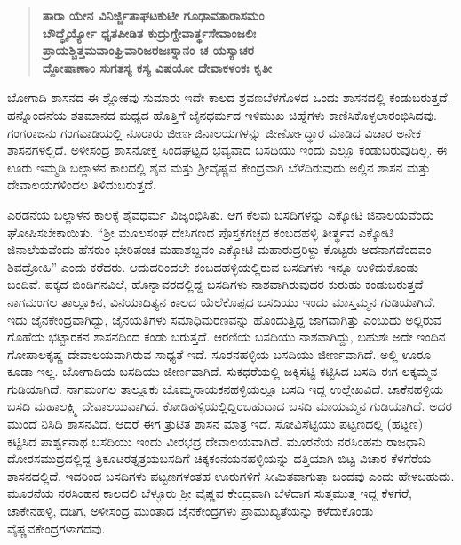 \begin{verse}
\textbf{ತಾರಾ ಯೇನ ವಿನಿರ್ಜ್ಜಿತಾಘಟಕುಟೀ ಗೂಢಾವತಾರಾಸಮಂ} \\\textbf{ಬೌದ್ಧೈರ್ಯ್ಯೋ ಧೃತಪೀಡಿತ ಕುದ್ರುಗ್ದೇವಾರ್ತ್ಥಸೇವಾಂಜಲಿಃ} \\\textbf{ಪ್ರಾಯಶ್ಚಿತ್ತಮವಾಂಘ್ರಿವಾರಿಜರಜಃಸ್ನಾನಂ ಚ ಯಸ್ಯಾಚರ} \\\textbf{ದ್ದೋಷಾಣಾಂ ಸುಗತಸ್ಯ ಕಸ್ಯ ವಿಷಯೋ ದೇವಾಕಳಂಕಃ ಕೃತೀ}
\end{verse}

ಬೋಗಾದಿ ಶಾಸನದ ಈ ಶ್ಲೋಕವು ಸುಮಾರು ಇದೇ ಕಾಲದ ಶ್ರವಣಬೆಳಗೊಳದ ಒಂದು ಶಾಸನದಲ್ಲಿ ಕಂಡುಬರುತ್ತದೆ. ಹನ್ನೊಂದನೆಯ ಶತಮಾನದ ಮಧ್ಯದ ಹೊತ್ತಿಗೆ ಜೈನಧರ್ಮದ ಇಳಿಮುಖ ಚಿಹ್ನೆಗಳು ಕಾಣಿಸಿಕೊಳ್ಳಲಾರಂಭಿಸಿದವು. ಗಂಗರಾಜನು ಗಂಗವಾಡಿಯಲ್ಲಿ ನೂರಾರು ಜೀರ್ಣಜಿನಾಲಯಗಳನ್ನು ಜೀರ್ಣೋದ್ಧಾರ ಮಾಡಿದ ವಿಚಾರ ಅನೇಕ ಶಾಸನಗಳಲ್ಲಿದೆ. ಅಳೀಸಂದ್ರ ಶಾಸನೋಕ್ತ ಸಿಂದಘಟ್ಟದ ಭವ್ಯವಾದ ಬಸದಿಯು ಇಂದು ಎಲ್ಲೂ ಕಂಡುಬರುವುದಿಲ್ಲ. ಈ ಊರು ಇಮ್ಮಡಿ ಬಲ್ಲಾಳನ ಕಾಲದಲ್ಲಿ ಶೈವ ಮತ್ತು ಶ‍್ರೀವೈಷ್ಣವ ಕೇಂದ್ರವಾಗಿ ಬೆಳೆದಿರುವುದು ಅಲ್ಲಿನ ಶಾಸನ ಮತ್ತು ದೇವಾಲಯಗಳಿಂದಲ ತಿಳಿದುಬರುತ್ತದೆ.

ಎರಡನೆಯ ಬಲ್ಲಾಳನ ಕಾಲಕ್ಕೆ ಶೈವಧರ್ಮ ವಿಜೃಂಭಿಸಿತು. ಆಗ ಕೆಲವು ಬಸದಿಗಳನ್ನು ಎಕ್ಕೋಟಿ ಜಿನಾಲಯವೆಂದು ಘೋಷಿಸಬೇಕಾಯಿತು. “ಶ‍್ರೀ ಮೂಲಸಂಘ ದೇಸಿಗಣದ ಪೊಸ್ತಕಗಚ್ಛದ ಕಂಬದಹಳ್ಳಿ ತೀರ್ತ್ಥವ ಎಕ್ಕೋಟಿ ಜಿನಾಲೆಯವೆಂದು ಹೆಸರುಂ ಭೇರಿಪಂಚ ಮಹಾಶಬ್ದವಂ ಎಕ್ಕೋಟಿ ಮಹಾರುದ್ರರಿಳ್ದು ಕೊಟ್ಟರು ಅದನಾಗದೆಂದವಂ ಶಿವದ್ರೋಹಿ” ಎಂದು ಕರೆದರು. ಆದುದರಿಂದಲೇ ಕಂಬದಹಳ್ಳಿಯಲ್ಲಿರುವ ಬಸದಿಗಳು ಇನ್ನೂ ಉಳಿದುಕೊಂಡು ಬಂದಿವೆ. ಪಕ್ಕದ ಬಿಂಡಿಗನವಿಲೆ, ಹೊನ್ನಾವರದಲ್ಲಿದ್ದ ಬಸದಿಗಳು ನಾಶವಾಗಿರುವುದರ ಕುರುಹು ಕಂಡುಬರುತ್ತದೆ ನಾಗಮಂಗಲ ತಾಲ್ಲೂಕಿನ, ವಿನಯಾದಿತ್ಯನ ಕಾಲದ ಯೆಲೆಕೊಪ್ಪದ ಬಸದಿಯು ಇಂದು ಮಾಸ್ತಮ್ಮನ ಗುಡಿಯಾಗಿದೆ. ಇದು ಜೈನಕೇಂದ್ರವಾಗಿದ್ದು, ಜೈನಯತಿಗಳು ಸಮಾಧಿಮರಣವನ್ನು ಹೊಂದುತ್ತಿದ್ದ ಜಾಗವಾಗಿತ್ತು ಎಂಬುದು ಅಲ್ಲಿರುವ ಗೊಹೆಯ ಭಟ್ಟಾರಕನ ಶಾಸನದಿಂದ ಕಂಡು ಬರುತ್ತದೆ. ಆರಣಿಯ ಬಸದಿಯು ನಾಶವಾಗಿದ್ದು, ಬಹುಶಃ ಅದೇ ಇಂದಿನ ಗೋಪಾಲಕೃಷ್ಣ ದೇವಾಲಯವಾಗಿರುವ ಸಾಧ್ಯತೆ ಇದೆ. ಸೂರನಹಳ್ಳಿಯ ಬಸದಿಯು ಜೀರ್ಣವಾಗಿದೆ. ಅಲ್ಲಿ ಊರೂ ಕೂಡಾ ಇಲ್ಲ. ಬೋಗಾದಿಯ ಬಸದಿಯು ಜೀರ್ಣವಾಗಿದೆ. ಸುಕಧರೆಯಲ್ಲಿ ಜಕ್ಕಿಸೆಟ್ಟಿ ಕಟ್ಟಿಸಿದ ಬಸದಿ ಈಗ ಲಕ್ಕಮ್ಮನ ಗುಡಿಯಾಗಿದೆ. ನಾಗಮಂಗಲ ತಾಲ್ಲೂಕು ಬೊಮ್ಮನಾಯಕನಹಳ್ಳಿಯಲ್ಲೂ ಬಸದಿ ಇದ್ದ ಉಲ್ಲೇಖವಿದೆ. ಚಾಕೆನಹಳ್ಳಿಯ ಬಸದಿ ಮಹಾಲಕ್ಷ್ಮಿ ದೇವಾಲಯವಾಗಿದೆ. ಕೋಡಿಹಳ್ಳಿಯಲ್ಲಿದ್ದಿರಬಹುದಾದ ಬಸದಿ ಮಾಯಮ್ಮನ ಗುಡಿಯಾಗಿದೆ. ಅದರ ಮುಂದೆ ನಿಸಿದಿ ಶಾಸನವಿದೆ. ಆದರೆ ಈಗ ತ್ರುಟಿತ ಶಾಸನ ಮಾತ್ರ ಇದೆ. ಸೋವಿಸೆಟ್ಟಿಯು ಪಟ್ಟಣದಲ್ಲಿ (ಹಟ್ಟಣ) ಕಟ್ಟಿಸಿದ ಪಾರ್ಶ್ವನಾಥ ಬಸದಿಯು ಇಂದು ವೀರಭದ್ರ ದೇವಾಲಯವಾಗಿದೆ. ಮೂರನೆಯ ನರಸಿಂಹನು ರಾಜಧಾನಿ ದೋರಸಮುದ್ರದಲ್ಲಿದ್ದ ತ್ರಿಕೂಟರತ್ನತ್ರಯಬಸದಿಗೆ ಚಿಕ್ಕಕಂನೆಯನಹಳ್ಳಿಯನ್ನು ದತ್ತಿಯಾಗಿ ಬಿಟ್ಟ ವಿಚಾರ ಕೆಳಗೆರೆಯ ಶಾಸನದಲ್ಲಿದೆ. ಇದರಿಂದ ಬಸದಿಗಳು ಪಟ್ಟಣಗಳಂತಹ ಊರುಗಳಿಗೆ ಸೀಮಿತವಾಗುತ್ತಾ ಬಂದವು ಎಂದು ಹೇಳಬಹುದು. ಮೂರನೆಯ ನರಸಿಂಹನ ಕಾಲದಲಿ ಬೆಳ್ಳೂರು ಶ‍್ರೀ ವೈಷ್ಣವ ಕೇಂದ್ರವಾಗಿ ಬೆಳೆದಾಗ ಸುತ್ತಮುತ್ತ ಇದ್ದ ಕೆಳಗೆರೆ, ಚಾಕೇನಹಳ್ಳಿ, ದಡಿಗ, ಅಳೀಸಂದ್ರ ಮುಂತಾದ ಜೈನಕೇಂದ್ರಗಳು ಪ್ರಾಮುಖ್ಯತೆಯನ್ನು ಕಳೆದುಕೊಂಡು ವೈಷ್ಣವಕೇಂದ್ರಗಳಾಗದವು.

